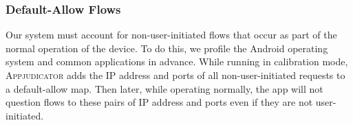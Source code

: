 \subsubsection{Default-Allow Flows}
\label{sec:default-allow-flows}

Our system must account for non-user-initiated flows that occur as part of the
normal operation of the device. To do this, we profile the Android operating
system and common applications in advance.  While running in calibration mode,
\textsc{Appjudicator} adds the IP address and ports of all non-user-initiated
requests to a default-allow map. Then later, while operating normally, the app
will not question flows to these pairs of IP address and ports even if they are
not user-initiated.


\newpage
